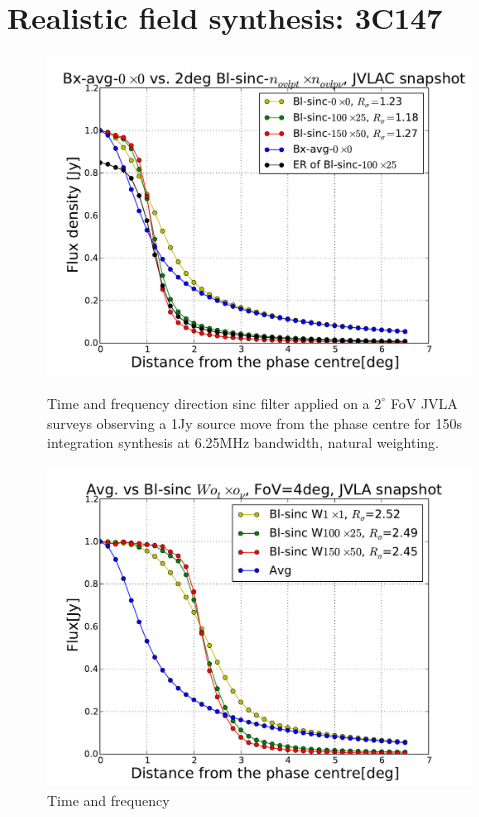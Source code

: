 \documentclass[useAMS,usenatbib]{mn2e}
\begin{document}
\section{Realistic field synthesis: 3C147}
 \begin{figure}
    \centering
  \begin{minipage}{0.36\linewidth}\includegraphics[width=1\textwidth]{./Figures/Bl-sinc-FoV2-vla.pdf}\caption{Time and frequency 
  direction sinc filter applied on a $2^{\circ}$ FoV JVLA surveys observing a 1Jy source move from the phase centre for 150s integration 
  synthesis at 6.25MHz bandwidth, natural weighting.}\label{fig:Bl-sinc-FoV2}\end{minipage}
  \hspace{1cm}
  \begin{minipage}{0.36\linewidth}\includegraphics[width=1\textwidth]{./Figures/Bl-sinc-FoV4-vla.pdf}\caption{Time and frequency 
}
\end{minipage}
\end{figure}
\end{document}
